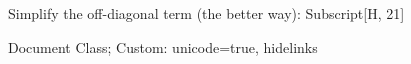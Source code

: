 Simplify the off-diagonal term (the better way): Subscript[H, 21]

Document Class; Custom: 
unicode=true, hidelinks
